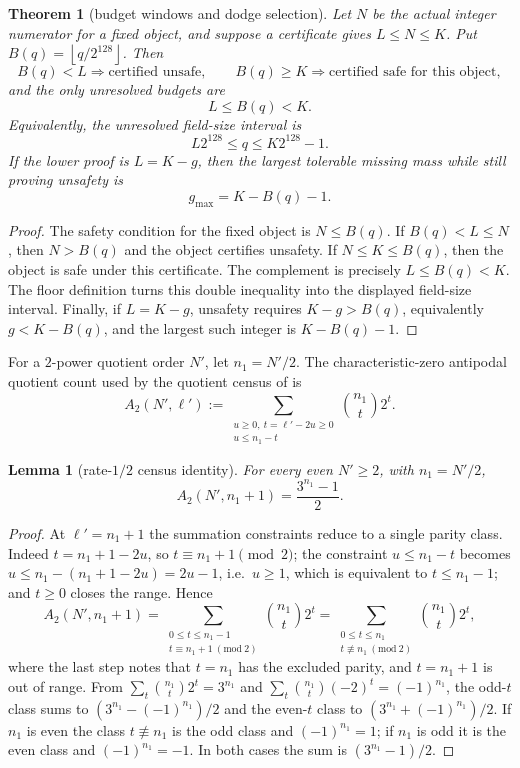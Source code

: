 \documentclass[11pt]{article}
\newtheorem{theorem}{Theorem}[section]
\newtheorem{lemma}[lemma]{Lemma}
\theoremstyle{definition}
\theoremstyle{remark}
\providecommand{\floor}[1]{\left\lfloor #1\right\rfloor}
\begin{document}
\begin{theorem}[budget windows and dodge selection]\label{thm:capf-windows}
Let $N$ be the actual integer numerator for a fixed object, and suppose a certificate gives $L\le N\le K$.  Put $B(q)=\floor{q/2^{128}}$.  Then
\[
        B(q)<L \Rightarrow \text{certified unsafe},
        \qquad
        B(q)\ge K \Rightarrow \text{certified safe for this object},
\]
and the only unresolved budgets are
\[
        L\le B(q)<K.
\]
Equivalently, the unresolved field-size interval is
\[
        L2^{128}\le q\le K2^{128}-1.
\]
If the lower proof is $L=K-g$, then the largest tolerable missing mass while still proving unsafety is
\[
        g_{\max}=K-B(q)-1.
\]
\end{theorem}

\begin{proof}
The safety condition for the fixed object is $N\le B(q)$.  If $B(q)<L\le N$, then $N>B(q)$ and the object certifies unsafety.  If $N\le K\le B(q)$, then the object is safe under this certificate.  The complement is precisely $L\le B(q)<K$.  The floor definition turns this double inequality into the displayed field-size interval.  Finally, if $L=K-g$, unsafety requires $K-g>B(q)$, equivalently $g<K-B(q)$, and the largest such integer is $K-B(q)-1$.
\end{proof}

For a $2$-power quotient order $N'$, let $n_1=N'/2$.  The characteristic-zero antipodal quotient count used by the quotient census of \cite{Cho26b} is
\[
        A_2(N',\ell')
        :=
        \sum_{\substack{u\ge0,\ t=\ell'-2u\ge0\\ u\le n_1-t}}
        \binom{n_1}{t}2^t .
\]

\begin{lemma}[rate-$1/2$ census identity]\label{lem:capf-census-identity}
For every even $N'\ge2$, with $n_1=N'/2$,
\[
        A_2(N',n_1+1)=\frac{3^{n_1}-1}{2}.
\]
\end{lemma}

\begin{proof}
At $\ell'=n_1+1$ the summation constraints reduce to a single parity class.  Indeed $t=n_1+1-2u$, so $t\equiv n_1+1\pmod2$; the constraint $u\le n_1-t$ becomes $u\le n_1-(n_1+1-2u)=2u-1$, i.e.\ $u\ge1$, which is equivalent to $t\le n_1-1$; and $t\ge0$ closes the range.  Hence
\[
        A_2(N',n_1+1)
        =\sum_{\substack{0\le t\le n_1-1\\ t\equiv n_1+1\ (\mathrm{mod}\ 2)}}\binom{n_1}t2^t
        =\sum_{\substack{0\le t\le n_1\\ t\not\equiv n_1\ (\mathrm{mod}\ 2)}}\binom{n_1}t2^t,
\]
where the last step notes that $t=n_1$ has the excluded parity, and $t=n_1+1$ is out of range.  From $\sum_t\binom{n_1}t2^t=3^{n_1}$ and $\sum_t\binom{n_1}t(-2)^t=(-1)^{n_1}$, the odd-$t$ class sums to $(3^{n_1}-(-1)^{n_1})/2$ and the even-$t$ class to $(3^{n_1}+(-1)^{n_1})/2$.  If $n_1$ is even the class $t\not\equiv n_1$ is the odd class and $(-1)^{n_1}=1$; if $n_1$ is odd it is the even class and $(-1)^{n_1}=-1$.  In both cases the sum is $(3^{n_1}-1)/2$.
\end{proof}
\end{document}

